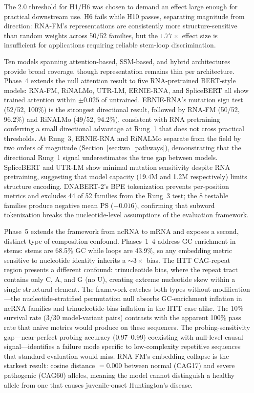 \documentclass[11pt]{article}
\begin{document}
The 2.0 threshold for H1/H6 was chosen to demand an effect large
enough for practical downstream use.  H6 fails while H10 passes,
separating magnitude from direction: RNA-FM's representations are
consistently more structure-sensitive than random weights across
50/52 families, but the $1.77\times$ effect size is insufficient for
applications requiring reliable stem-loop discrimination.

Ten models spanning attention-based, SSM-based, and hybrid
architectures provide broad coverage, though representation remains
thin per architecture.  Phase~4 extends the null attention result to
five RNA-pretrained BERT-style models: RNA-FM, RiNALMo, UTR-LM,
ERNIE-RNA, and SpliceBERT all show trained attention within $\pm
0.025$ of untrained.  ERNIE-RNA's mutation sign test (52/52, 100\%)
is the strongest directional result, followed by RNA-FM (50/52,
96.2\%) and RiNALMo (49/52, 94.2\%), consistent with RNA pretraining
conferring a small directional advantage at Rung~1 that does not
cross practical thresholds.  At Rung~3, ERNIE-RNA and RiNALMo
separate from the field by two orders of magnitude
(Section~\ref{sec:two_pathways}), demonstrating that the directional
Rung~1 signal underestimates the true gap between models.
SpliceBERT and UTR-LM show minimal mutation sensitivity
despite RNA pretraining, suggesting that model capacity (19.4M and
1.2M respectively) limits structure encoding.  DNABERT-2's BPE
tokenization prevents per-position metrics and excludes 44 of 52
families from the Rung~3 test; the 8 testable families produce
negative mean PS ($-0.016$), confirming that subword tokenization
breaks the nucleotide-level assumptions of the evaluation framework.

Phase~5 extends the framework from ncRNA to mRNA and exposes a second,
distinct type of composition confound.  Phases~1--4 address GC
enrichment in stems: stems are 68.5\% GC while loops are 43.9\%, so
any embedding metric sensitive to nucleotide identity inherits a
${\sim}3\times$ bias.  The HTT CAG-repeat region presents a different
confound: trinucleotide bias, where the repeat tract contains only C,
A, and G (no U), creating extreme nucleotide skew within a single
structural element.  The framework catches both types without
modification---the nucleotide-stratified permutation null absorbs
GC-enrichment inflation in ncRNA families and trinucleotide-bias
inflation in the HTT case alike.  The 10\% survival rate (3/30
model-variant pairs) contrasts with the apparent 100\% pass rate that
naive metrics would produce on these sequences.  The
probing-sensitivity gap---near-perfect probing accuracy (0.97--0.99)
coexisting with null-level causal signal---identifies a failure mode
specific to low-complexity repetitive sequences that standard
evaluation would miss.  RNA-FM's embedding collapse is the starkest
result: cosine distance $= 0.000$ between normal (CAG17) and severe
pathogenic (CAG60) alleles, meaning the model cannot distinguish a
healthy allele from one that causes juvenile-onset Huntington's
disease.
\end{document}
